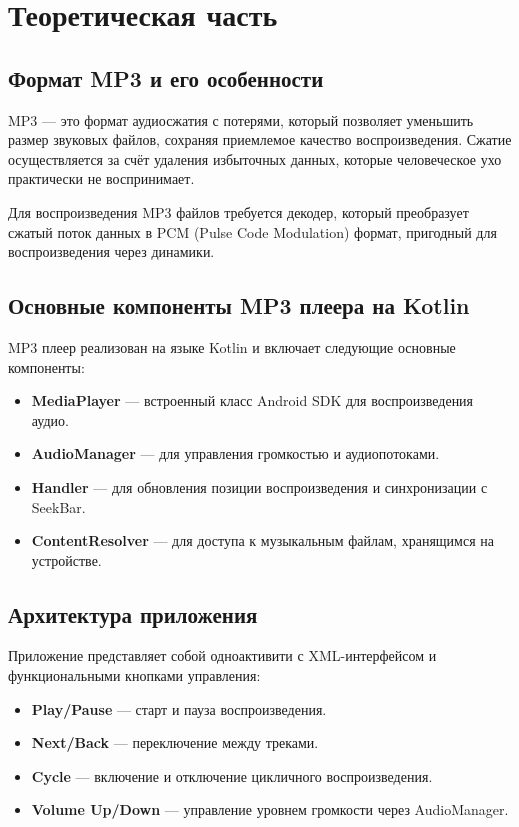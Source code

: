\chapter{Теоретическая часть}

\section{Формат MP3 и его особенности}

MP3 — это формат аудиосжатия с потерями, который позволяет уменьшить размер звуковых файлов, сохраняя приемлемое качество воспроизведения. Сжатие осуществляется за счёт удаления избыточных данных, которые человеческое ухо практически не воспринимает.  

Для воспроизведения MP3 файлов требуется декодер, который преобразует сжатый поток данных в PCM (Pulse Code Modulation) формат, пригодный для воспроизведения через динамики.

\section{Основные компоненты MP3 плеера на Kotlin}

MP3 плеер реализован на языке Kotlin и включает следующие основные компоненты:

\begin{itemize}
    \item \textbf{MediaPlayer} — встроенный класс Android SDK для воспроизведения аудио.
    \item \textbf{AudioManager} — для управления громкостью и аудиопотоками.
    \item \textbf{Handler} — для обновления позиции воспроизведения и синхронизации с SeekBar.
    \item \textbf{ContentResolver} — для доступа к музыкальным файлам, хранящимся на устройстве.
\end{itemize}

\section{Архитектура приложения}

Приложение представляет собой одноактивити с XML-интерфейсом и функциональными кнопками управления:

\begin{itemize}
    \item \textbf{Play/Pause} — старт и пауза воспроизведения.
    \item \textbf{Next/Back} — переключение между треками.
    \item \textbf{Cycle} — включение и отключение цикличного воспроизведения.
    \item \textbf{Volume Up/Down} — управление уровнем громкости через AudioManager.
\end{itemize}

